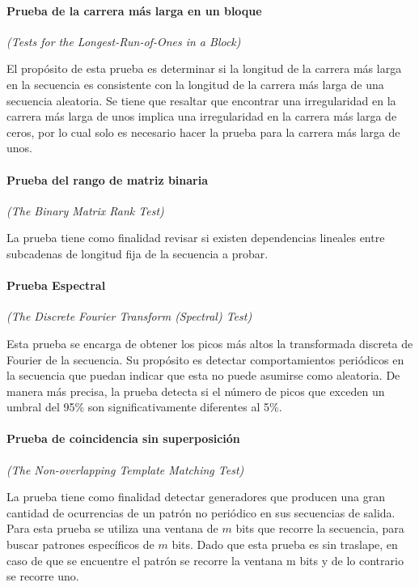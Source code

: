 
\paragraph{Prueba de la carrera más larga en un bloque} %
\textit{(Tests for the Longest-Run-of-Ones in a Block)}

El propósito de esta prueba es determinar si la longitud de la carrera más 
larga en la secuencia es consistente con la longitud de la carrera más larga 
de una secuencia aleatoria. Se tiene que resaltar que encontrar una 
irregularidad en la carrera más larga de unos implica una irregularidad en 
la carrera más larga de ceros, por lo cual solo es necesario hacer la prueba 
para la carrera más larga de unos.

\paragraph{Prueba del rango de matriz binaria} %
\textit{(The Binary Matrix Rank Test)}

La prueba tiene como finalidad revisar si existen dependencias lineales entre 
subcadenas de longitud fija de la secuencia a probar.

\paragraph{Prueba Espectral} %
\textit{(The Discrete Fourier Transform (Spectral) Test)}

Esta prueba se encarga de obtener los picos más altos la transformada 
discreta de Fourier de la secuencia. Su propósito es detectar comportamientos 
periódicos en la secuencia que puedan indicar que esta no puede asumirse como 
aleatoria. De manera más precisa, la prueba detecta si el número de picos que 
exceden un umbral del 95\% son significativamente diferentes al 5\%.

\paragraph{Prueba de coincidencia sin superposición} %
\textit{(The Non-overlapping Template Matching Test)}

La prueba tiene como finalidad detectar generadores que producen una gran 
cantidad de ocurrencias de un patrón no periódico en sus secuencias de salida. 
Para esta prueba se utiliza una ventana de $m$ bits que recorre la secuencia, 
para buscar patrones específicos de $m$ bits. Dado que esta prueba es sin 
traslape, en caso de que se encuentre el patrón se recorre la ventana m bits 
y de lo contrario se recorre uno.

